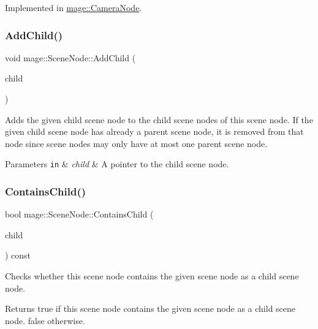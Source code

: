 Implemented in \hyperlink{classmage_1_1_camera_node_a8b94f57b3a04f70b2c04a3d7c1ba3082}{mage\+::\+Camera\+Node}.

\hypertarget{classmage_1_1_scene_node_ac07f89af783b1658a1f74205914f6fa3}{}\label{classmage_1_1_scene_node_ac07f89af783b1658a1f74205914f6fa3} 
\subsubsection{\texorpdfstring{Add\+Child()}{AddChild()}}
{\footnotesize\ttfamily void mage\+::\+Scene\+Node\+::\+Add\+Child (\begin{DoxyParamCaption}\item[{\hyperlink{classmage_1_1_scene_node}{Scene\+Node} $\ast$}]{child }\end{DoxyParamCaption})}

Adds the given child scene node to the child scene nodes of this scene node. If the given child scene node has already a parent scene node, it is removed from that node since scene nodes may only have at most one parent scene node.


\begin{DoxyParams}[1]{Parameters}
\mbox{\tt in}  & {\em child} & A pointer to the child scene node. \\
\hline
\end{DoxyParams}
\hypertarget{classmage_1_1_scene_node_a99c86a1d18b41d4c5ce0384ba53a0952}{}\label{classmage_1_1_scene_node_a99c86a1d18b41d4c5ce0384ba53a0952} 
\subsubsection{\texorpdfstring{Contains\+Child()}{ContainsChild()}}
{\footnotesize\ttfamily bool mage\+::\+Scene\+Node\+::\+Contains\+Child (\begin{DoxyParamCaption}\item[{const \hyperlink{classmage_1_1_scene_node}{Scene\+Node} $\ast$}]{child }\end{DoxyParamCaption}) const}

Checks whether this scene node contains the given scene node as a child scene node.

\begin{DoxyReturn}{Returns}
{\ttfamily true} if this scene node contains the given scene node as a child scene node. {\ttfamily false} otherwise. 
\end{DoxyReturn}
\hypertarget{classmage_1_1_scene_node_a99c5eb3c253a2e620bd85ac845d3bb77}{}\label{classmage_1_1_scene_node_a99c5eb3c253a2e620bd85ac845d3bb77} 
